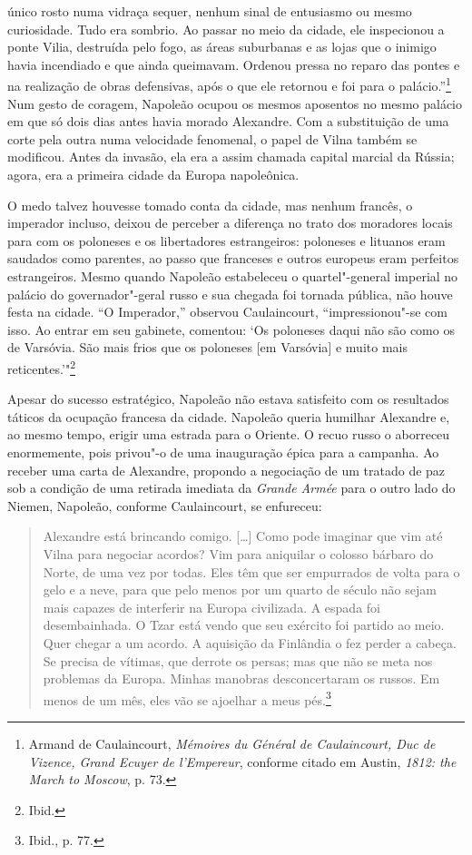único rosto numa vidraça sequer, nenhum sinal de entusiasmo ou mesmo
curiosidade. Tudo era sombrio. Ao passar no meio da cidade, ele
inspecionou a ponte Vilia, destruída pelo fogo, as áreas suburbanas e as
lojas que o inimigo havia incendiado e que ainda queimavam. Ordenou
pressa no reparo das pontes e na realização de obras defensivas, após o
que ele retornou e foi para o palácio.''\footnote{Armand de Caulaincourt, \textit{Mémoires du Général de Caulaincourt, Duc de Vizence, Grand Ecuyer de l'Empereur}, conforme citado em Austin, \textit{1812: the March to Moscow}, p. 73.} Num gesto de coragem, Napoleão ocupou os mesmos aposentos no mesmo palácio em que só dois dias
antes havia morado Alexandre. Com a substituição de uma corte pela outra
numa velocidade fenomenal, o papel de Vilna também se modificou. Antes
da invasão, ela era a assim chamada capital marcial da Rússia; agora,
era a primeira cidade da Europa napoleônica.

O medo talvez houvesse tomado conta da cidade, mas nenhum francês, o
imperador incluso, deixou de perceber a diferença no trato dos moradores
locais para com os poloneses e os libertadores estrangeiros: poloneses e
lituanos eram saudados como parentes, ao passo que franceses e outros
europeus eram perfeitos estrangeiros. Mesmo quando Napoleão estabeleceu
o quartel"-general imperial no palácio do governador"-geral russo e sua
chegada foi tornada pública, não houve festa na cidade. ``O Imperador,''
observou Caulaincourt, ``impressionou"-se com isso. Ao entrar em seu
gabinete, comentou: `Os poloneses daqui não são como os de Varsóvia. São
mais frios que os poloneses {[}em Varsóvia{]} e muito mais
reticentes.'"\footnote{Ibid.}

Apesar do sucesso estratégico, Napoleão não estava satisfeito com os
resultados táticos da ocupação francesa da cidade. Napoleão queria
humilhar Alexandre e, ao mesmo tempo, erigir uma estrada para o Oriente.
O recuo russo o aborreceu enormemente, pois privou"-o de uma inauguração
épica para a campanha. Ao receber uma carta de Alexandre, propondo a
negociação de um tratado de paz sob a condição de uma retirada imediata
da \textit{Grande Armée} para o outro lado do Niemen, Napoleão, conforme
Caulaincourt, se enfureceu:

%

\begin{quote}
Alexandre está brincando comigo. [\ldots{}] Como pode imaginar que vim até
Vilna para negociar acordos? Vim para aniquilar o colosso bárbaro do
Norte, de uma vez por todas. Eles têm que ser empurrados de volta para o
gelo e a neve, para que pelo menos por um quarto de século não sejam
mais capazes de interferir na Europa civilizada. A espada foi
desembainhada. O Tzar está vendo que seu exército foi partido ao meio.
Quer chegar a um acordo. A aquisição da Finlândia o fez perder a cabeça.
Se precisa de vítimas, que derrote os persas; mas que não se meta nos
problemas da Europa. Minhas manobras desconcertaram os russos. Em menos
de um mês, eles vão se ajoelhar a meus pés.\footnote{Ibid., p. 77.}
\end{quote}

